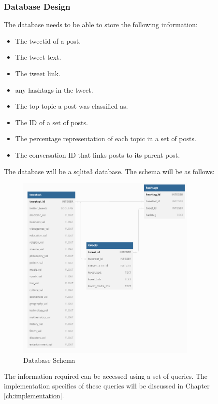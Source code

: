 \subsubsection{Database Design}
The database needs to be able to store the following information:
\begin{itemize}
    \item The tweetid of a post.
    \item The tweet text.
    \item The tweet link.
    \item any hashtags in the tweet.
    \item The top topic a post was classified as.
    \item The ID of a set of posts.
    \item The percentage representation of each topic in a set of posts.
    \item The conversation ID that links posts to its parent post.
\end{itemize}
The database will be a sqlite3 database. The schema will be as follows:
\begin{figure}
    \centering
    \includegraphics[width=0.8\textwidth]{images/database.png}
    \caption{Database Schema}
    \label{fig:database}
\end{figure}
The information required can be accessed using a set of queries. The implementation specifics of these queries will be discussed in Chapter \ref{ch:implementation}.